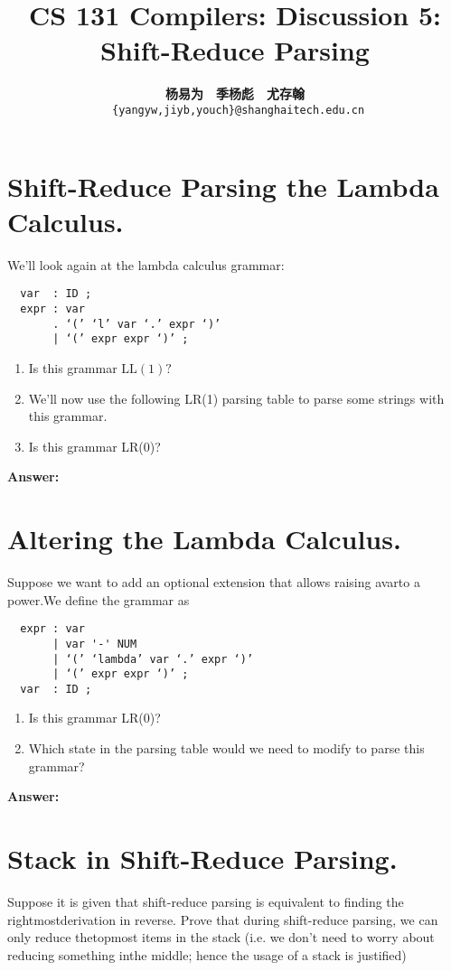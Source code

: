 \documentclass[a4paper]{article}
\title{CS 131 Compilers: Discussion 5: Shift-Reduce Parsing}
\author{\textbf{杨易为}~~\textbf{季杨彪}~~\textbf{尤存翰} \\ \texttt{ \{yangyw,jiyb,youch\}@shanghaitech.edu.cn}}
\theoremstyle{definition}
\begin{document}
\maketitle
\section{Shift-Reduce Parsing the Lambda Calculus.}
 We'll look again at the lambda calculus grammar:

 \begin{verbatim}
  var  : ID ;
  expr : var
       . ‘(’ ‘l’ var ‘.’ expr ‘)’
       | ‘(’ expr expr ‘)’ ;
  \end{verbatim}
\begin{enumerate}
    \item Is this grammar $\mathrm{LL}(1) ?$
    \item We'll now use the following LR(1) parsing table to parse some strings with this
    grammar.
    \item Is this grammar LR(0)?
\end{enumerate}
\textbf{Answer:}


\section{Altering the Lambda Calculus.}
Suppose we want to add an optional extension that allows raising avarto a power.We define the grammar as
\begin{verbatim}
  expr : var 
       | var '-' NUM
       | ‘(’ ‘lambda’ var ‘.’ expr ‘)’
       | ‘(’ expr expr ‘)’ ;
  var  : ID ;
  \end{verbatim}
  \begin{enumerate}
    \item Is this grammar LR(0)?
    \item Which state in the parsing table would we need to modify to parse this grammar?
  \end{enumerate}

\textbf{Answer:}

\section{Stack in Shift-Reduce Parsing.}
Suppose  it  is  given  that  shift-reduce  parsing  is  equivalent  to  finding  the  rightmostderivation in reverse.  Prove that during shift-reduce parsing, we can only reduce thetopmost items in the stack (i.e.  we don’t need to worry about reducing something inthe middle; hence the usage of a stack is justified)
\end{document}

